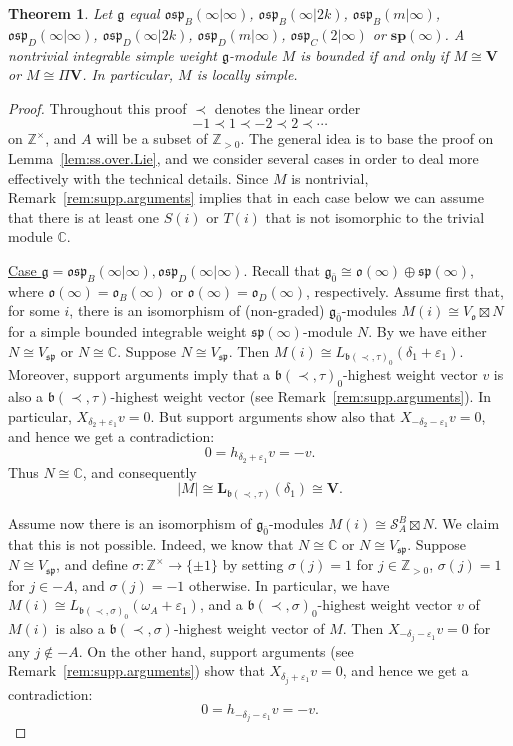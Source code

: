\documentclass[12pt]{amsart}
\newcommand\C{\mathbb{C}}
\newcommand\Z{\mathbb{Z}}
\newcommand\g{\mathfrak{g}}
\newcommand\fb{\mathfrak{b}}
\newcommand\fsp{\mathfrak{sp}}
\newcommand\fosp{\mathfrak{osp}}
\newcommand\fo{\mathfrak{o}}
\newcommand\cS{\mathcal{S}}
\newcommand\bV{\mathbf{V}}
\newcommand\bsp{\mathbf{sp}}
\newcommand\bL{\mathbf{L}}
\theoremstyle{plain}
\newtheorem{theo}{Theorem}[section]
\theoremstyle{definition}
\numberwithin{equation}{section}
\begin{document}
\begin{theo}\label{thm:classification.BCDp}
Let $\g$ equal $\fosp_B(\infty|\infty)$, $\fosp_B(\infty|2k)$, $\fosp_B(m|\infty)$, $\fosp_D(\infty|\infty)$, $\fosp_D(\infty|2k)$, $\fosp_D(m|\infty)$, $\fosp_C(2|\infty)$ or $\bsp(\infty)$. A nontrivial integrable simple weight $\g$-module $M$ is bounded if and only if $M\cong \bV$ or $M\cong \Pi \bV$. In particular, $M$ is locally simple.
\end{theo}
\begin{proof}
Throughout this proof $\prec$ denotes the linear order 
	\[
-1\prec 1\prec -2\prec 2\prec \cdots
	\]
on $\Z^\times $, and $A$ will be a subset of $\Z_{>0}$. The general idea is to base the proof on Lemma~\ref{lem:ss.over.Lie}, and we consider several cases in order to deal more effectively with the technical details. Since $M$ is nontrivial, Remark~\ref{rem:supp.arguments} implies that in each case below we can assume that there is at least one $S(i)$ or $T(i)$ that is not isomorphic to the trivial module $\C$.

\underline{Case $\g = \fosp_B(\infty|\infty), \fosp_D(\infty|\infty)$}. Recall that $\g_{\bar 0} \cong \fo(\infty)\oplus \fsp(\infty)$, where $\fo(\infty) = \fo_B(\infty)$ or $\fo(\infty) = \fo_D(\infty)$, respectively. Assume first that, for some $i$, there is an isomorphism of (non-graded) $\g_{\bar 0}$-modules $M(i)\cong V_\fo \boxtimes N$ for a simple bounded integrable weight $\fsp(\infty)$-module $N$. By  \cite[Proposition~5.7]{GP20} we have either $N \cong V_\fsp$ or $N\cong \C$. Suppose $N \cong V_\fsp$. Then $M(i)\cong L_{\fb(\prec,\tau)_0}(\delta_1 + \varepsilon_1)$. Moreover, support arguments imply that a $\fb(\prec,\tau)_0$-highest weight vector $v$ is also a $\fb(\prec,\tau)$-highest weight vector (see Remark~\ref{rem:supp.arguments}). In particular, $X_{\delta_2 + \varepsilon_1} v=0$.  But support arguments show also that $X_{-\delta_2 - \varepsilon_1} v=0$, and hence we get a contradiction:
	\[
0=h_{\delta_2+\varepsilon_1}v = -v.
	\]
Thus $N\cong \C$, and consequently
	\[
|M|\cong \bL_{\fb(\prec,\tau)}(\delta_1)\cong \bV.
	\]

Assume now there is an isomorphism of $\g_{\bar 0}$-modules $M(i)\cong \cS_A^B\boxtimes N$. We claim that this is not possible. Indeed, we know that $N\cong \C$ or $N\cong V_\fsp$. Suppose $N \cong V_\fsp$, and define $\sigma: \Z^\times \to \{\pm 1\}$ by setting $\sigma(j)=1$ for $j\in \Z_{>0}$, $\sigma(j)=1$ for $j\in -A$, and $\sigma(j)=-1$ otherwise. In particular, we have $M(i)\cong L_{\fb(\prec,\sigma)_0}(\omega_A + \varepsilon_1)$, and a $\fb(\prec,\sigma)_0$-highest weight vector $v$ of $M(i)$ is also a $\fb(\prec,\sigma)$-highest weight vector of $M$. Then $X_{-\delta_j - \varepsilon_1} v=0$ for any $j\notin -A$.  On the other hand, support arguments (see Remark~\ref{rem:supp.arguments}) show that $X_{\delta_j + \varepsilon_1} v=0$, and hence we get a contradiction:
	\[
0=h_{-\delta_j-\varepsilon_1}v = -v.
	\]


\end{proof}
\end{document}
